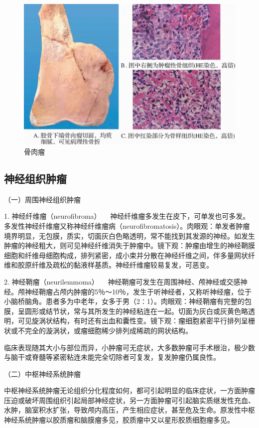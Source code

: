 \begin{figure}[!htbp]
 \centering
 \includegraphics{./images/Image00086.jpg}
 \caption{骨肉瘤}
 \label{fig5-17}
  \end{figure}

\subsection{神经组织肿瘤}

{（一）周围神经组织肿瘤}

{1. 神经纤维瘤（neurofibroma）}
　神经纤维瘤多发生在皮下，可单发也可多发。多发性神经纤维瘤又称神经纤维瘤病（neurofibromatosis）。肉眼观：单发者肿瘤境界明显，无包膜，质实，切面灰白色略透明，常不能找到其发源的神经。如发生肿瘤的神经粗大，则可见神经纤维消失于肿瘤中。镜下观：肿瘤由增生的神经鞘膜细胞和纤维母细胞构成，排列紧密，成小束并分散在神经纤维之间，伴多量网状纤维和胶原纤维及疏松的黏液样基质。神经纤维瘤较易复发，可恶变。

{2. 神经鞘瘤（neurilemmoma）}
　神经鞘瘤可发生在周围神经、颅神经或交感神经。颅神经鞘瘤占颅内肿瘤的5％～10％，发生于听神经者，又称听神经瘤，位于小脑桥脑角。患者多为中老年，女多于男（2∶1）。肉眼观：神经鞘瘤有完整的包膜，呈圆形或结节状，常与其所发生的神经粘连在一起。切面为灰白或灰黄色略透明，可见旋涡状结构，有时还有出血和囊性变。镜下观：瘤细胞紧密平行排列呈栅状或不完全的漩涡状，或瘤细胞稀少排列成稀疏的网状结构。

临床表现随其大小与部位而异，小肿瘤可无症状，大多数肿瘤可手术根治，极少数与脑干或脊髓等紧密粘连未能完全切除者可复发，复发肿瘤仍属良性。

{（二）中枢神经系统肿瘤}

中枢神经系统肿瘤无论组织分化程度如何，都可引起明显的临床症状，一方面肿瘤压迫或破坏周围组织引起局部神经症状，另一方面肿瘤可引起脑实质继发性充血、水肿，脑室积水扩张，导致颅内高压，产生相应症状，甚至危及生命。原发性中枢神经系统肿瘤以胶质瘤和脑膜瘤多见，胶质瘤中又以星形胶质细胞瘤多见。

